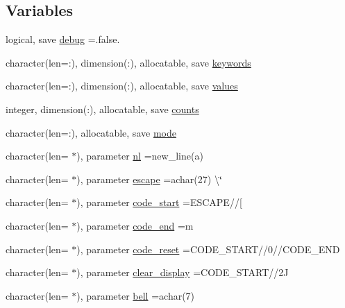 \subsection*{Variables}
\begin{DoxyCompactItemize}
\item 
logical, save \mbox{\hyperlink{namespacem__escape_af068eb2561159352a9a406c95157b131}{debug}} =.false.
\item 
character(len=\+:), dimension(\+:), allocatable, save \mbox{\hyperlink{namespacem__escape_a35e957e007844dbfe641b3d915fba048}{keywords}}
\item 
character(len=\+:), dimension(\+:), allocatable, save \mbox{\hyperlink{namespacem__escape_a4c3b430bde66148e6f2c79c5418384fa}{values}}
\item 
integer, dimension(\+:), allocatable, save \mbox{\hyperlink{namespacem__escape_a7e8e011813de1e58d7c8bcda489d8f1c}{counts}}
\item 
character(len=\+:), allocatable, save \mbox{\hyperlink{namespacem__escape_ab4e7fcb41457772a9bd4e4413d5355d6}{mode}}
\item 
character(len= $\ast$), parameter \mbox{\hyperlink{namespacem__escape_aa17be0f87e5ec9012a38c04bfbb5e588}{nl}} =new\+\_\+line(\textquotesingle{}a\textquotesingle{})
\item 
character(len= $\ast$), parameter \mbox{\hyperlink{namespacem__escape_a9931f535eb0f6f24df5a121331faa5ef}{escape}} =achar(27) \textbackslash{}\char`\"{}
\item 
character(len= $\ast$), parameter \mbox{\hyperlink{namespacem__escape_a6d5af6b1571cba22511523c53c71fa6f}{code\+\_\+start}} =E\+S\+C\+A\+PE//\textquotesingle{}\mbox{[}\textquotesingle{}
\item 
character(len= $\ast$), parameter \mbox{\hyperlink{namespacem__escape_af913c326395b9bf2c089c30698d2c742}{code\+\_\+end}} =\textquotesingle{}m\textquotesingle{}
\item 
character(len= $\ast$), parameter \mbox{\hyperlink{namespacem__escape_aaaf7224f2104dcd571cdaa69b61b9d01}{code\+\_\+reset}} =C\+O\+D\+E\+\_\+\+S\+T\+A\+RT//\textquotesingle{}0\textquotesingle{}//C\+O\+D\+E\+\_\+\+E\+ND
\item 
character(len= $\ast$), parameter \mbox{\hyperlink{namespacem__escape_a9d45e30ea5891b89dc9a61ba1b5dbc03}{clear\+\_\+display}} =C\+O\+D\+E\+\_\+\+S\+T\+A\+RT//\textquotesingle{}2\+J\textquotesingle{}
\item 
character(len= $\ast$), parameter \mbox{\hyperlink{namespacem__escape_a2cd9c30d3783af9d1f74a50e7f1dbd7f}{bell}} =achar(7)

\end{DoxyCompactItemize}
